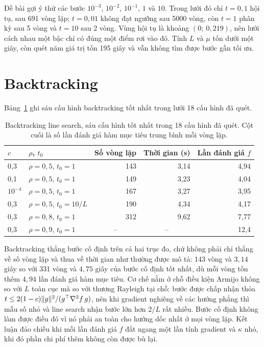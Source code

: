 \documentclass[12pt, a4paper, oneside]{report}
\theoremstyle{definition}
\begin{document}
Đề bài gợi ý thử các bước $10^{-3}$, $10^{-2}$, $10^{-1}$, $1$ và $10$. Trong lưới
đó chỉ $t = 0{,}1$ hội tụ, sau 691 vòng lặp; $t = 0{,}01$ không đạt ngưỡng sau
\num{5000} vòng, còn $t = 1$ phân kỳ sau 5 vòng và $t = 10$ sau 2 vòng. Vùng hội
tụ là khoảng $(0;\ 0{,}219)$, nên lưới cách nhau một bậc chỉ có đúng một điểm rơi
vào đó. Tính $L$ và $\mu$ tốn dưới một giây, còn quét năm giá trị tốn 195 giây và
vẫn không tìm được bước gần tối ưu.

\section{Backtracking}

Bảng~\ref{tab:armijo} ghi sáu cấu hình backtracking tốt nhất trong lưới 18 cấu
hình đã quét.

\begin{table}[tbp]
  \centering
  \caption{Backtracking line search, sáu cấu hình tốt nhất trong 18 cấu hình đã
    quét. Cột cuối là số lần đánh giá hàm mục tiêu trung bình mỗi vòng lặp.}
  \label{tab:armijo}
  \begin{tabular}{llrrr}
    \toprule
    $c$ & $\rho$, $t_{0}$ & Số vòng lặp & Thời gian (s) & Lần đánh giá $f$ \\
    \midrule
    0{,}3    & $\rho = 0{,}5$, $t_{0} = 1$    & 143 & 3{,}14 & 4{,}94 \\
    0{,}1    & $\rho = 0{,}5$, $t_{0} = 1$    & 149 & 3{,}23 & 4{,}04 \\
    $10^{-4}$ & $\rho = 0{,}5$, $t_{0} = 1$    & 167 & 3{,}27 & 3{,}95 \\
    0{,}3    & $\rho = 0{,}5$, $t_{0} = 10/L$ & 190 & 4{,}34 & 4{,}17 \\
    0{,}3    & $\rho = 0{,}8$, $t_{0} = 1$    & 312 & 9{,}62 & 7{,}77 \\
    0{,}3    & $\rho = 0{,}9$, $t_{0} = 1$    & \multicolumn{1}{c}{--} & \multicolumn{1}{c}{--} & 12{,}4 \\
    \bottomrule
  \end{tabular}
\end{table}

Backtracking thắng bước cố định trên cả hai trục đo, chứ không phải chỉ thắng về
số vòng lặp và thua về thời gian như thường được mô tả: 143 vòng và $3{,}14$ giây
so với 331 vòng và $4{,}75$ giây của bước cố định tốt nhất, dù mỗi vòng tốn thêm
$4{,}94$ lần đánh giá hàm mục tiêu. Cơ chế nằm ở chỗ điều kiện Armijo không so
với $L$ toàn cục mà so với thương Rayleigh tại chỗ: bước được chấp nhận thỏa
$t \le 2(1-c) \lVert g\rVert^{2} / (g^{\top} \nabla^{2} f\, g)$, nên khi gradient nghiêng
về các hướng phẳng thì mẫu số nhỏ và line search nhận bước lớn hơn $2/L$ rất
nhiều. Bước cố định không làm được điều đó vì nó phải an toàn cho hướng dốc nhất
ở mọi vòng lặp. Kết luận đảo chiều khi mỗi lần đánh giá $f$ đắt ngang một lần
tính gradient và $\kappa$ nhỏ, khi đó phần chi phí thêm không còn được bù lại.
\end{document}
